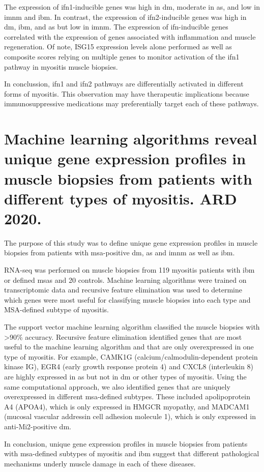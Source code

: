 The expression of \gls{ifn}1-inducible genes was high in \gls{dm}, moderate in \gls{as}, and low in \gls{imnm} and \gls{ibm}. In contrast, the expression of \gls{ifn}2-inducible genes was high in \gls{dm}, \gls{ibm}, and \gls{as} but low in \gls{imnm}. The expression of \gls{ifn}-inducible genes correlated with the expression of genes associated with inflammation and muscle regeneration. Of note, ISG15 expression levels alone performed as well as composite scores relying on multiple genes to monitor activation of the \gls{ifn}1 pathway in myositis muscle biopsies.

In conclussion, \gls{ifn}1 and \gls{ifn}2 pathways are differentially activated in different forms of myositis. This observation may have therapeutic implications because immunosuppressive medications may preferentially target each of these pathways.



\section{Machine learning algorithms reveal unique gene expression profiles in muscle biopsies from patients with different types of myositis. ARD 2020.}
\label{sec:rnaseq_ml}

The purpose of this study was to define unique gene expression profiles in muscle biopsies from patients with \gls{msa}-positive \gls{dm}, \gls{as} and \gls{imnm} as well as \gls{ibm}.

RNA-seq was performed on muscle biopsies from 119 myositis patients with \gls{ibm} or defined \gls{msa}s and 20 controls. Machine learning algorithms were trained on transcriptomic data and recursive feature elimination was used to determine which genes were most useful for classifying muscle biopsies into each type and MSA-defined subtype of myositis.

The support vector machine learning algorithm classified the muscle biopsies with >90\% accuracy. Recursive feature elimination identified genes that are most useful to the machine learning algorithm and that are only overexpressed in one type of myositis.
For example, CAMK1G (calcium/calmodulin-dependent protein kinase IG), EGR4 (early growth response protein 4) and CXCL8 (interleukin 8) are highly expressed in \gls{as} but not in \gls{dm} or other types of myositis. Using the same computational approach, we also identified genes that are uniquely overexpressed in different \gls{msa}-defined subtypes. These included apolipoprotein A4 (APOA4), which is only expressed in HMGCR myopathy, and MADCAM1 (mucosal vascular addressin cell adhesion molecule 1), which is only expressed in anti-Mi2-positive \gls{dm}.

In conclusion, unique gene expression profiles in muscle biopsies from patients with \gls{msa}-defined subtypes of myositis and \gls{ibm} suggest that different pathological mechanisms underly muscle damage in each of these diseases.

